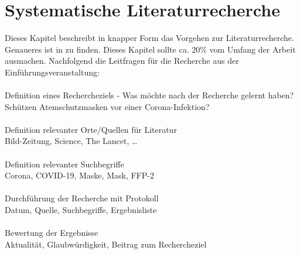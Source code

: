 \section{Systematische Literaturrecherche}
Dieses Kapitel beschreibt in knapper Form das Vorgehen zur Literaturrecherche. Genaueres ist in \cite{keele2007guidelines} zu finden. Dieses Kapitel sollte ca. 20\% vom Umfang der Arbeit ausmachen. Nachfolgend die Leitfragen für die Recherche aus der Einführungsveranstaltung: \\ \\
Definition eines Rechercheziels - Was möchte nach der Recherche gelernt haben? Schützen Atemschutzmasken vor einer Corona-Infektion? \\ \\
Definition relevanter Orte/Quellen für Literatur \\
Bild-Zeitung, Science, The Lancet, … \\ \\
Definition relevanter Suchbegriffe \\
Corona, COVID-19, Maske, Mask, FFP-2 \\ \\
Durchführung der Recherche mit Protokoll \\
Datum, Quelle, Suchbegriffe, Ergebnisliste  \\ \\
Bewertung der Ergebnisse \\
Aktualität, Glaubwürdigkeit, Beitrag zum Rechercheziel